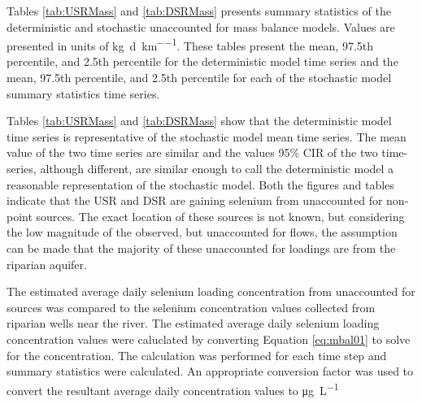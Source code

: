 \begin{linenumbers}
Tables \ref{tab:USRMass} and \ref{tab:DSRMass} presents summary statistics of the deterministic and stochastic unaccounted for mass balance models.  Values are presented in units of \si{\kilo\gram\per\day\per\kilo\meter}.  These tables present the mean, 97.5th percentile, and 2.5th percentile for the deterministic model time series and the mean, 97.5th percentile, and 2.5th percentile for each of the stochastic model summary statistics time series.

\subtabletop
\begin{table}[htbp]
	\centering
	\caption[USR deterministic and stochastic dissolved selenium unaccounted for loading time-series results tables.]{USR deterministic and stochastic dissolved selenium unaccounted for loading time-series results tables.  Values are in units of \si{\kilo\gram\per\day\per\kilo\meter}.}
	\label{tab:USRMass}
	
	\tablevspace
\end{table}
\begin{table}[htbp]
	\centering
	\caption[DSR deterministic and stochastic dissolved selenium unaccounted for loading time-series results tables.]{DSR deterministic and stochastic dissolved selenium unaccounted for loading time-series results tables.  Values are in units of \si{\kilo\gram\per\day\per\kilo\meter}.}
	\label{tab:DSRMass}
	
\end{table}


Tables \ref{tab:USRMass} and \ref{tab:DSRMass} show that the deterministic model time series is representative of the stochastic model mean time series.  The mean value of the two time series are similar and the values 95\% CIR of the two time-series, although different, are similar enough to call the deterministic model a reasonable representation of the stochastic model.  Both the figures and tables indicate that the USR and DSR are gaining selenium from unaccounted for non-point sources.  The exact location of these sources is not known, but considering the low magnitude of the observed, but unaccounted for flows, the assumption can be made that the majority of these unaccounted for loadings are from the riparian aquifer.

The estimated average daily selenium loading concentration from unaccounted for sources was compared to the selenium concentration values collected from riparian wells near the river.  The estimated average daily selenium loading concentration values were caluclated by converting Equation \ref{eq:mbal01} to solve for the concentration.  The calculation was performed for each time step and summary statistics were calculated.  An appropriate conversion factor was used to convert the resultant average daily concentration values to \si{\micro\g\per\liter}


\end{linenumbers}
